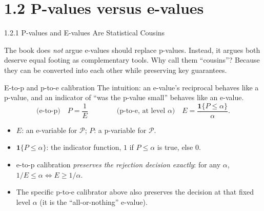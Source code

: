 \documentclass[aspectratio=169,10pt]{beamer}
\begin{document}
\section{1.2 P-values versus e-values}

\begin{frame}[allowframebreaks]{1.2.1 P-values and E-values Are Statistical Cousins}

The book does \emph{not} argue e-values should replace p-values. Instead,
it argues both deserve equal footing as complementary tools. Why call them
``cousins''? Because they can be converted into each other while
preserving key guarantees.

\begin{block}{E-to-p and p-to-e calibration}
The intuition: an e-value's reciprocal behaves like a p-value, and an
indicator of ``was the p-value small'' behaves like an e-value.
\[
  \text{(e-to-p)}\quad P = \frac{1}{E}
  \qquad\qquad
  \text{(p-to-e, at level $\alpha$)}\quad E = \frac{\mathbf{1}\{P \le \alpha\}}{\alpha}.
\]
\begin{itemize}
  \item $E$: an e-variable for $\mathcal{P}$; $P$: a p-variable for $\mathcal{P}$.
  \item $\mathbf{1}\{P\le\alpha\}$: the indicator function, $1$ if
    $P\le\alpha$ is true, else $0$.
  \item e-to-p calibration \emph{preserves the rejection decision exactly}:
    for any $\alpha$, $1/E \le \alpha \iff E \ge 1/\alpha$.
  \item The specific p-to-e calibrator above also preserves the decision at
    that fixed level $\alpha$ (it is the ``all-or-nothing'' e-value).
\end{itemize}
\end{block}

\framebreak


\end{frame}
\end{document}
